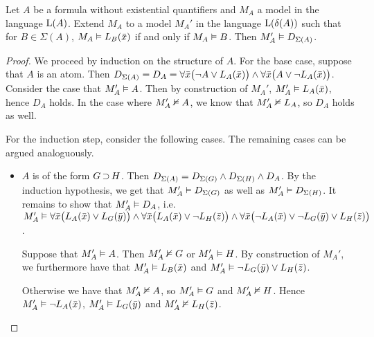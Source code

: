 
\begin{lemma}
	\label{lemma:m_prime}
	Let $A$ be a formula without existential quantifiers and $M_A$ a model in the language $\operatorname{L}(A)$.
	Extend $M_A$ to a model $M_A'$ in the language $\operatorname{L}(\delta(A))$ such that for $B\in\Sigma(A)$, $M_A\vDash L_B(\bar x)$ if and only if $M_A \vDash B$.
	Then $M_A' \vDash D_{\Sigma(A)}$.
\end{lemma}
\begin{proof}
	We proceed by induction on the structure of $A$.
	For the base case, suppose that $A$ is an atom. 
	Then $D_{\Sigma(A)} = D_A  =\allowbreak \forall \bar x \big(\lnot A \lor L_A(\bar x)\big) \land\allowbreak \forall \bar x \big(A \lor \lnot L_A(\bar x)\big)$. 
	Consider the case that $M_A' \vDash A$. Then by construction of $M_A'$, $M_A'\vDash L_A(\bar x)$, hence $D_A$ holds.
	In the case where $M_A' \nvDash A$, we know that $M_A' \nvDash L_A$, so $D_A$ holds as well.

	For the induction step, consider the following cases. The remaining cases can be argued analoguously.
	\begin{itemize}
		\item $A$ is of the form $G \operatorname{\supset} H$. 
			Then $D_{\Sigma(A)} =
			D_{\Sigma(G)} \land
			D_{\Sigma(H)} \land D_A$.
			By the induction hypothesis, we get that $M_A' \vDash D_{\Sigma(G)}$ as well as $M_A' \vDash D_{\Sigma(H)}$.
			It remains to show that $M_A' \vDash D_A$, i.e.~
			$M_A' \vDash \forall \bar x \big(L_A(\bar x) \lor L_G(\bar y)\big) \land
		\forall \bar x \big(L_A(\bar x) \lor \lnot L_H(\bar z)\big) \land \forall \bar x \big(\lnot L_A(\bar x) \lor \lnot L_G(\bar y) \lor L_H(\bar z)\big)  $.

		Suppose that $M_A' \vDash A$.
		Then $M_A' \nvDash G$ or $M_A' \vDash H$. By construction of $M_A'$, we furthermore have that $M_A' \vDash L_B(\bar x)$ and $M_A' \vDash \lnot L_G(\bar y) \lor L_H(\bar z)$.

		Otherwise we have that $M_A' \nvDash A$, so $M_A' \vDash G$ and $M_A' \nvDash H$.
		Hence $M_A' \vDash \lnot  L_A(\bar x)$, $M_A' \vDash L_G(\bar y)$ and $M_A' \nvDash L_H(\bar z)$.


\end{itemize}
\end{proof}
